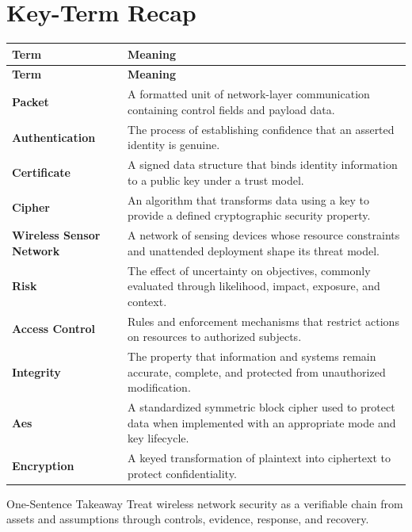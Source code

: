 \documentclass[11pt,letterpaper]{article}
\begin{document}
\section*{Key-Term Recap}
\begin{longtable}{>{\raggedright\arraybackslash}p{}>{\raggedright\arraybackslash}p{}}
\toprule\rowcolor{Navy}\color{white}\textbf{Term} & \color{white}\textbf{Meaning}\\\midrule
\endfirsthead
\toprule\rowcolor{Navy}\color{white}\textbf{Term} & \color{white}\textbf{Meaning}\\\midrule
\endhead
\textbf{Packet} & A formatted unit of network-layer communication containing control fields and payload data. \\\midrule
\textbf{Authentication} & The process of establishing confidence that an asserted identity is genuine. \\\midrule
\textbf{Certificate} & A signed data structure that binds identity information to a public key under a trust model. \\\midrule
\textbf{Cipher} & An algorithm that transforms data using a key to provide a defined cryptographic security property. \\\midrule
\textbf{Wireless Sensor Network} & A network of sensing devices whose resource constraints and unattended deployment shape its threat model. \\\midrule
\textbf{Risk} & The effect of uncertainty on objectives, commonly evaluated through likelihood, impact, exposure, and context. \\\midrule
\textbf{Access Control} & Rules and enforcement mechanisms that restrict actions on resources to authorized subjects. \\\midrule
\textbf{Integrity} & The property that information and systems remain accurate, complete, and protected from unauthorized modification. \\\midrule
\textbf{Aes} & A standardized symmetric block cipher used to protect data when implemented with an appropriate mode and key lifecycle. \\\midrule
\textbf{Encryption} & A keyed transformation of plaintext into ciphertext to protect confidentiality. \\\midrule
\bottomrule
\end{longtable}
\begin{CornellExamBox}{One-Sentence Takeaway}
Treat wireless network security as a verifiable chain from assets and assumptions through controls, evidence, response, and recovery.
\end{CornellExamBox}
\end{document}
